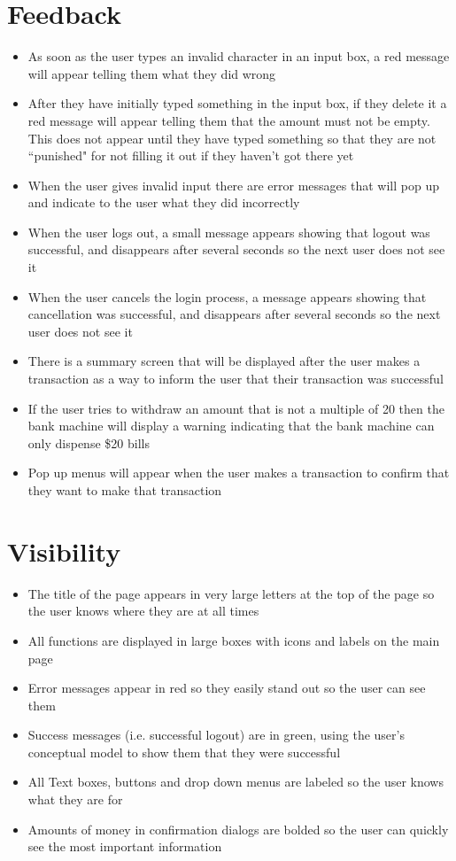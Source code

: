 \documentclass[10pt]{article}
\begin{document}
\section*{Feedback} %
\begin{itemize}
\item As soon as the user types an invalid character in an input box, a red message will appear telling them what they did wrong
\item After they have initially typed something in the input box, if they delete it a red message will appear telling them that the amount must not be empty. This does not appear until they have typed something so that they are not ``punished" for not filling it out if they haven't got there yet
\item When the user gives invalid input there are error messages that will pop up and indicate to the user what they did incorrectly
\item When the user logs out, a small message appears showing that logout was successful, and disappears after several seconds so the next user does not see it
\item When the user cancels the login process, a message appears showing that cancellation  was successful, and disappears after several seconds so the next user does not see it
\item There is a summary screen that will be displayed after the user makes a transaction as a way to inform the user that their transaction was successful
\item If the user tries to withdraw an amount that is not a multiple of 20 then the bank machine will display a warning indicating that the bank machine can only dispense \$20 bills
\item Pop up menus will appear when the user makes a transaction to confirm that they want to make that transaction\\
\end{itemize}

\section*{Visibility} %
\begin{itemize}
\item The title of the page appears in very large letters at the top of the page so the user knows where they are at all times
\item All functions are displayed in large boxes with icons and labels on the main page
\item Error messages appear in red so they easily stand out so the user can see them
\item Success messages (i.e. successful logout) are in green, using the user's conceptual model to show them that they were successful
\item All Text boxes, buttons and drop down menus are labeled so the user knows what they are for
\item Amounts of money in confirmation dialogs are bolded so the user can quickly see the most important information\\
\end{itemize}
\end{document}
